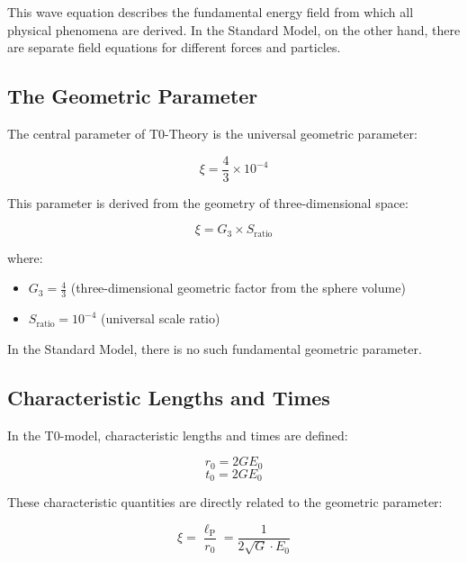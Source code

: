 \documentclass[12pt,a4paper]{article}
\newcommand{\lp}{\ell_{\text{P}}}
\theoremstyle{definition}
\begin{document}
	This wave equation describes the fundamental energy field from which all physical phenomena are derived. In the Standard Model, on the other hand, there are separate field equations for different forces and particles.
	
	\subsection{The Geometric Parameter}
	
	The central parameter of T0-Theory is the universal geometric parameter:
	
	\begin{equation}
		\boxed{\xi = \frac{4}{3} \times 10^{-4}}
	\end{equation}
	
	This parameter is derived from the geometry of three-dimensional space:
	
	\begin{equation}
		\xi = G_3 \times S_{\text{ratio}}
	\end{equation}
	
	where:
	\begin{itemize}
		\item $G_3 = \frac{4}{3}$ (three-dimensional geometric factor from the sphere volume)
		\item $S_{\text{ratio}} = 10^{-4}$ (universal scale ratio)
	\end{itemize}
	
	In the Standard Model, there is no such fundamental geometric parameter.
	
	\subsection{Characteristic Lengths and Times}
	
	In the T0-model, characteristic lengths and times are defined:
	
	\begin{equation}
		\boxed{r_0 = 2GE_0}
	\end{equation}
	\begin{equation}
		\boxed{t_0 = 2GE_0}
	\end{equation}
	
	These characteristic quantities are directly related to the geometric parameter:
	
	\begin{equation}
		\xi = \frac{\lp}{r_0} = \frac{1}{2\sqrt{G} \cdot E_0}
	\end{equation}
	
\end{document}
